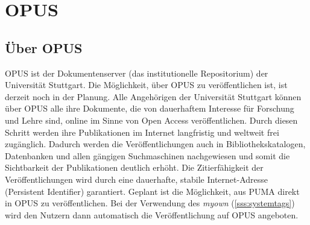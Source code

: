 \section{OPUS}
\label{sec:opus}
\subsection{Über OPUS}
\label{subsec:ueberOpus}
OPUS ist der Dokumentenserver (das institutionelle Repositorium) der Universität Stuttgart. Die Möglichkeit, über OPUS zu veröffentlichen ist, ist derzeit noch in der Planung. Alle Angehörigen der Universität Stuttgart können über OPUS alle ihre Dokumente, die von dauerhaftem Interesse für Forschung und Lehre sind, online im Sinne von Open Access veröffentlichen. Durch diesen Schritt werden ihre Publikationen im Internet langfristig und weltweit frei zugänglich. Dadurch werden die Veröffentlichungen auch in Bibliothekskatalogen, Datenbanken und allen gängigen Suchmaschinen nachgewiesen und somit die Sichtbarkeit der Publikationen deutlich erhöht. Die Zitierfähigkeit der Veröffentlichungen wird durch eine dauerhafte, stabile Internet-Adresse (Persistent Identifier) garantiert.
\newline\newline
Geplant ist die Möglichkeit, aus PUMA direkt in OPUS zu veröffentlichen. Bei der Verwendung des \tags \textit{myown} (\autoref{sss:systemtags}) wird den Nutzern dann automatisch die Veröffentlichung auf OPUS angeboten.  

